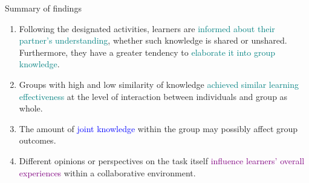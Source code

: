 \begin{frame}{Summary of findings}
    \begin{block}{}
        \begin{enumerate}
            \item <+-> Following the designated activities, learners are \textcolor{teal}{informed about their partner's understanding}, whether such knowledge is shared or unshared. Furthermore, they have a greater tendency to \textcolor{teal}{elaborate it into group knowledge}.
            \item <+-> Groups with high and low similarity of knowledge \textcolor{teal}{achieved similar learning effectiveness} at the level of interaction between individuals and group as whole.
            \item <+-> The amount of \textcolor{blue}{joint knowledge} within the group may possibly affect group outcomes.
            \item <+-> Different opinions or perspectives on the task itself \textcolor{purple}{influence learners’ overall experiences} within a collaborative environment. 
        \end{enumerate}
    \end{block}
\end{frame}